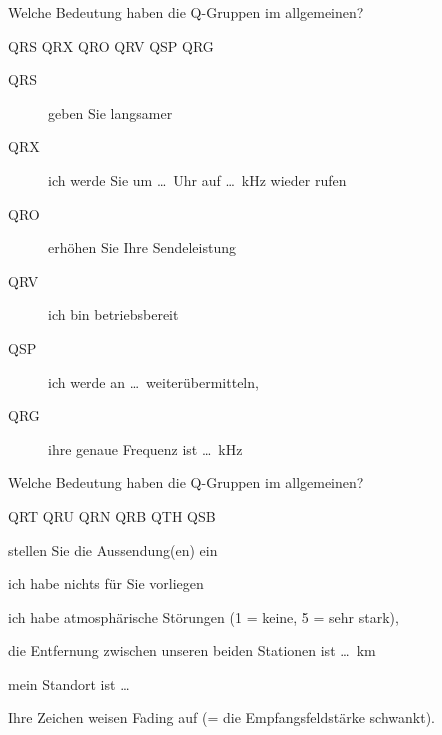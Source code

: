 \documentclass[avery5371,grid,frame,a4paper]{flashcards}
\newcommand{\card}[3]{
  \begin{flashcard}[{\chap} -- #1]{#2}#3\end{flashcard}
}
\begin{document}
\card{03b}{Welche Bedeutung haben die Q-Gruppen im allgemeinen?
  \begin{center}
    QRS \quad QRX \quad QRO \quad QRV \quad QSP \quad QRG
  \end{center}
}{\begin{description}
  \item[QRS] geben Sie langsamer
  \item[QRX] ich werde Sie um \dots~Uhr auf \dots~kHz wieder rufen
  \item[QRO] erhöhen Sie Ihre Sendeleistung
  \item[QRV] ich bin betriebsbereit
  \item[QSP] ich werde an \dots\ weiterübermitteln,
  \item[QRG] ihre genaue Frequenz ist \dots~kHz
\end{description}}

\card{03c}{Welche Bedeutung haben die Q-Gruppen im allgemeinen?
  \begin{center}
    QRT \quad QRU \quad QRN \quad QRB \quad QTH \quad QSB
  \end{center}
}{\begin{description}\itemsep0pt
  \item[QRT] stellen Sie die Aussendung(en) ein
  \item[QRU] ich habe nichts für Sie vorliegen
  \item[QRN] ich habe atmosphärische Störungen (1 = keine, 5 = sehr stark),
  \item[QRB] die Entfernung zwischen unseren beiden Stationen ist \dots\ km
  \item[QTH] mein Standort ist \dots
  \item[QSB] Ihre Zeichen weisen Fading auf (= die Empfangsfeldstärke schwankt).
 \end{description}
}
\end{document}
